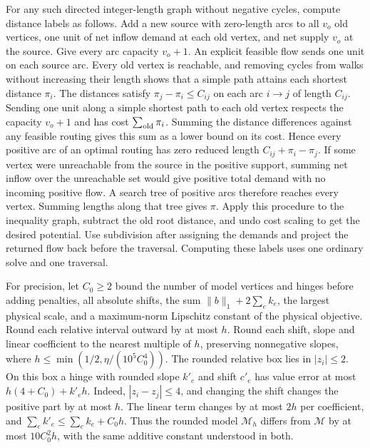 \documentclass[11pt]{article}
\begin{document}
For any such directed integer-length graph without negative cycles, compute distance labels as follows. Add a new source with zero-length arcs to all \(v_o\) old vertices, one unit of net inflow demand at each old vertex, and net supply \(v_o\) at the source. Give every arc capacity \(v_o+1\). An explicit feasible flow sends one unit on each source arc. Every old vertex is reachable, and removing cycles from walks without increasing their length shows that a simple path attains each shortest distance \(\pi_i\). The distances satisfy \(\pi_j-\pi_i\le C_{ij}\) on each arc \(i\to j\) of length \(C_{ij}\). Sending one unit along a simple shortest path to each old vertex respects the capacity \(v_o+1\) and has cost \(\sum_{\rm old}\pi_i\). Summing the distance differences against any feasible routing gives this sum as a lower bound on its cost. Hence every positive arc of an optimal routing has zero reduced length \(C_{ij}+\pi_i-\pi_j\). If some vertex were unreachable from the source in the positive support, summing net inflow over the unreachable set would give positive total demand with no incoming positive flow. A search tree of positive arcs therefore reaches every vertex. Summing lengths along that tree gives \(\pi\). Apply this procedure to the inequality graph, subtract the old root distance, and undo cost scaling to get the desired potential. Use subdivision after assigning the demands and project the returned flow back before the traversal. Computing these labels uses one ordinary solve and one traversal.

For precision, let \(C_0\ge2\) bound the number of model vertices and hinges before adding penalties, all absolute shifts, the sum \(\|b\|_1+2\sum_e k_e\), the largest physical scale, and a maximum-norm Lipschitz constant of the physical objective. Round each relative interval outward by at most \(h\). Round each shift, slope and linear coefficient to the nearest multiple of \(h\), preserving nonnegative slopes, where \(h\le\min(1/2,\eta/(10^5 C_0^4))\). The rounded relative box lies in \(|z_i|\le2\). On this box a hinge with rounded slope \(k'_e\) and shift \(c'_e\) has value error at most \(h(4+C_0)+k'_e h\). Indeed, \(|z_i-z_j|\le4\), and changing the shift changes the positive part by at most \(h\). The linear term changes by at most \(2h\) per coefficient, and \(\sum_e k'_e\le \sum_e k_e+C_0h\). Thus the rounded model \(\mathcal M_h\) differs from \(\mathcal M\) by at most \(10C_0^2 h\), with the same additive constant understood in both.
\end{document}
